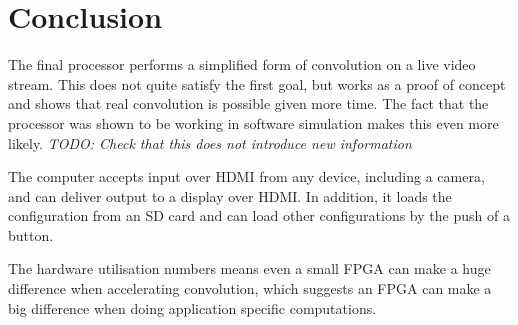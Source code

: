 \section{Conclusion}
The final processor performs a simplified form of convolution on a live video stream.
This does not quite satisfy the first goal,
but works as a proof of concept and shows that real convolution is possible given more time.
The fact that the processor was shown to be working in software simulation makes this even more likely.
\emph{TODO: Check that this does not introduce new information}

The computer accepts input over HDMI from any device, including a camera, and can deliver output to a display over HDMI.
In addition,
it loads the configuration from an SD card and can load other configurations by the push of a button.

The hardware utilisation numbers means even a small FPGA can make a huge difference when accelerating convolution,
which suggests an FPGA can make a big difference when doing application specific computations.
